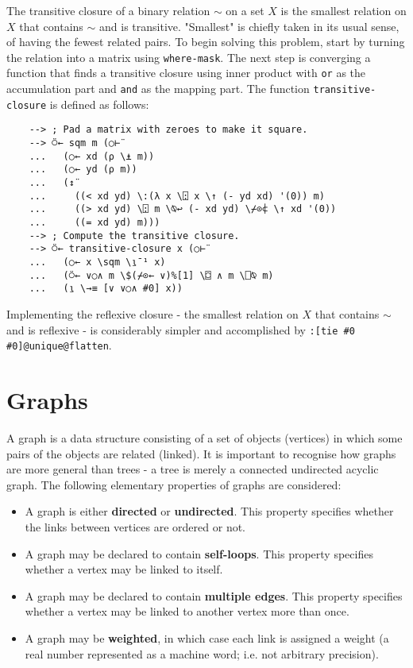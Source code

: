 The transitive closure of a binary relation $\sim$ on a set $X$ is the smallest relation on $X$ that contains $\sim$ and is transitive. "Smallest" is chiefly taken in its usual sense, of having the fewest related pairs. To begin solving this problem, start by turning the relation into a matrix using \verb|where-mask|. The next step is converging a function that finds a transitive closure using inner product with \verb|or| as the accumulation part and \verb|and| as the mapping part. The function \verb|transitive-closure| is defined as follows:

\begin{Verbatim}
    --> ; Pad a matrix with zeroes to make it square.
    --> ⍥← sqm m (○⊢¨
    ...   (○← xd (⍴ \⍎ m))
    ...   (○← yd (⍴ m))
    ...   (↕¨
    ...     ((< xd yd) \:(λ x \⍠ x \↑ (- yd xd) '(0)) m)
    ...     ((> xd yd) \⍠ m \⍉↩ (- xd yd) \⌿⊙⍧ \↑ xd '(0))
    ...     ((= xd yd) m)))
    --> ; Compute the transitive closure.
    --> ⍥← transitive-closure x (○⊢¨
    ...   (○← x \sqm \⍸¯¹ x)
    ...   (⍥← ∨○∧ m \$(⌿⊙← ∨)%[1] \⌼ ∧ m \⎕⍉ m)
    ...   (⍸ \→≡ [∨ ∨○∧ #0] x))
\end{Verbatim}

Implementing the reflexive closure - the smallest relation on $X$ that contains $\sim$ and is reflexive - is considerably simpler and accomplished by \verb|:[tie #0 #0]@unique@flatten|.

\section{Graphs}

A graph is a data structure consisting of a set of objects (vertices) in which some pairs of the objects are related (linked). It is important to recognise how graphs are more general than trees - a tree is merely a connected undirected acyclic graph. The following elementary properties of graphs are considered:

\begin{itemize}
    \item A graph is either \textbf{directed} or \textbf{undirected}. This property specifies whether the links between vertices are ordered or not.
    \item A graph may be declared to contain \textbf{self-loops}. This property specifies whether a vertex may be linked to itself.
    \item A graph may be declared to contain \textbf{multiple edges}. This property specifies whether a vertex may be linked to another vertex more than once.
    \item A graph may be \textbf{weighted}, in which case each link is assigned a weight (a real number represented as a machine word; i.e. not arbitrary precision).
\end{itemize}

